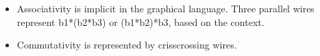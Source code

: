 \documentclass[preprint]{sigplanconf}
\begin{document}
\begin{itemize}
\item Associativity is implicit in the graphical language. Three parallel
  wires represent {{b1*(b2*b3)}} or {{(b1*b2)*b3}}, based on the context.
\begin{center}
\end{center}

\item Commutativity is represented by crisscrossing wires.
\begin{multicols}{2}
\begin{center}
\end{center}
\begin{center}
\end{center}
\end{multicols}


\end{itemize}
\end{document}

